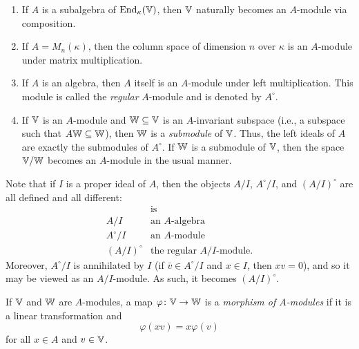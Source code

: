 \begin{xmpls}${}$
    \begin{enumerate}[\rm a)]
        \item If\/ $A$ is a subalgebra of ${\operatorname{End}}_\kappa(\mathbb V)$, then\/ $\mathbb V$ naturally becomes an\/ $A$-module via composition.
        
        \item If\/ $A = M_n(\kappa)$, then the column space of dimension\/ $n$ over\/ $\kappa$ is an\/ $A$-module under matrix multiplication.
        
        \item If\/ $A$ is an algebra, then\/ $A$ itself is an\/ $A$-module under left multiplication. This module is called the \textsl{regular} $A$-module and is denoted by\/ $A^\circ$. 

        \item If\/ $\mathbb V$ is an\/ $A$-module and\/ $\mathbb W \subseteq\mathbb V$ is an\/ $A$-invariant subspace (i.e., a subspace such that $A\mathbb W\subseteq\mathbb W$), then\/ $\mathbb W$ is a \textsl{submodule} of\/ $\mathbb V$. Thus, the left ideals of\/ $A$ are exactly the submodules of\/ $A^\circ$. If\/ $\mathbb W$ is a submodule of\/ $\mathbb V$, then the space\/ $\mathbb V/\mathbb W$ becomes an\/ $A$-module in the usual manner. 
    \end{enumerate}
\end{xmpls}

\begin{rem}
    Note that if\/ $I$ is a proper ideal of\/ $A$, then the objects\/ $A/I$,\/ $A^\circ/I$, and\/ $(A/I)^\circ$ are all defined and all different:
    $$
    \begin{array}{c|l}
        &\text{is}\\
        \hline
        A/I &\text{an $A$-algebra}\\
        A^\circ/I&\text{an $A$-module}\\
        (A/I)^\circ&\text{the regular $A/I$-module.}
    \end{array}
    $$
    Moreover, $A^\circ/I$ is annihilated by\/ $I$ (if\/ $\bar v \in A^\circ/I$ and\/ $x \in I$, then\/ $xv = 0$), and so it may be viewed as an\/ $A/I$-module. As such, it becomes\/ $(A/I)^\circ$.
\end{rem} 

\begin{defn}
    If $\mathbb V$ and $\mathbb W$ are $A$-modules, a map $\varphi\colon\mathbb V\to\mathbb W$  is a \textsl{morphism of $A$-modules} if it is a linear transformation and
    \begin{equation}\label{eq:end_A}
        \varphi(xv)=x\varphi(v)
    \end{equation}
    for all $x\in A$ and $v\in\mathbb V$.
\end{defn}

